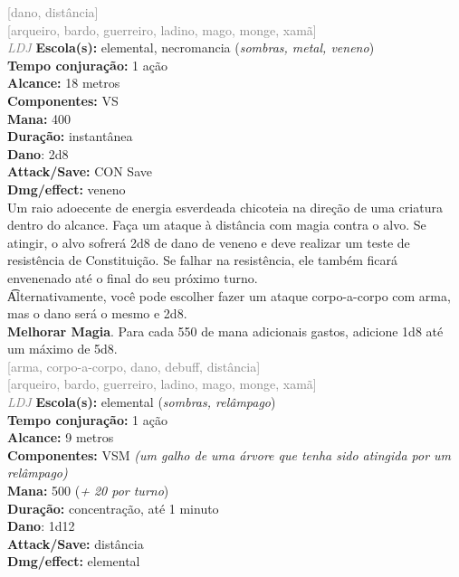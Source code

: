 \documentclass{RPG_Adventure}[2021/10/20]
\begin{document}
{\scriptsize \textcolor{gray}{[dano, distância]\\}}
{\scriptsize \textcolor{gray}{[arqueiro, bardo, guerreiro, ladino, mago, monge, xamã]\\}}
{\tiny \textcolor{gray}{\textit{LDJ}}}\jump{}
{\small \t \textbf{Escola(s):} elemental, necromancia (\textit{sombras, metal, veneno})\\\t \textbf{Tempo conjuração:} 1 ação\\\t \textbf{Alcance:} 18 metros\\\t \textbf{Componentes:} VS\\\t \textbf{Mana:} 400\\\t \textbf{Duração:} instantânea\\\t \textbf{Dano}: 2d8\\\t \textbf{Attack/Save:} CON Save\\\t \textbf{Dmg/effect:} veneno\\}
{\normalsize Um raio adoecente de energia esverdeada chicoteia na direção de uma criatura dentro do alcance. Faça um ataque à distância com magia contra o alvo. Se atingir, o alvo sofrerá 2d8 de dano de veneno e deve realizar um teste de resistência de Constituição. Se falhar na resistência, ele também ficará envenenado até o final do seu próximo turno.\\\t Alternativamente, você pode escolher fazer um ataque corpo-a-corpo com arma, mas o dano será o mesmo e 2d8.\\\t \textbf{Melhorar Magia}. Para cada 550 de mana adicionais gastos, adicione 1d8 até um máximo de 5d8.\\}
{\scriptsize \textcolor{gray}{[arma, corpo-a-corpo, dano, debuff, distância]\\}}
{\scriptsize \textcolor{gray}{[arqueiro, bardo, guerreiro, ladino, mago, monge, xamã]\\}}
{\tiny \textcolor{gray}{\textit{LDJ}}}\jump{}
{\small \t \textbf{Escola(s):} elemental (\textit{sombras, relâmpago})\\\t \textbf{Tempo conjuração:} 1 ação\\\t \textbf{Alcance:} 9 metros\\\t \textbf{Componentes:} VSM \textit{(um galho de uma árvore que tenha sido atingida por um relâmpago)}\\\t \textbf{Mana:} 500 (\textit{+ 20 por turno})\\\t \textbf{Duração:} concentração, até 1 minuto\\\t \textbf{Dano}: 1d12\\\t \textbf{Attack/Save:} distância\\\t \textbf{Dmg/effect:} elemental\\}
\end{document}
